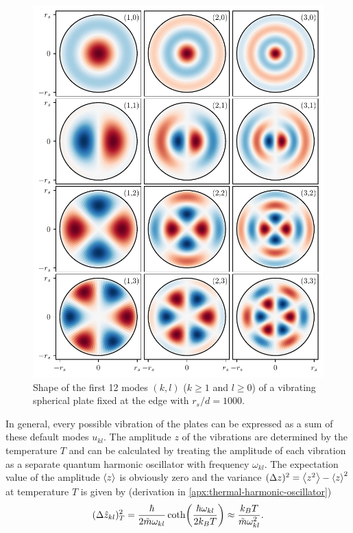 \begin{figure}[!htbp]
  \centering
  \includegraphics[width=\textwidth]{./../figures/vibrations/vibrational-modes-rd_bu.pdf}
  \caption{Shape of the first 12 modes $(k,l)$ ($k \geq 1$ and $l \geq 0$) of a vibrating spherical plate fixed at the edge with $r_s/d = 1000$.}
  \label{fig:5:vibrational-modes}
\end{figure}
In general, every possible vibration of the plates can be expressed as a sum of these default modes $u_{kl}$.
The amplitude $z$ of the vibrations are determined by the temperature $T$ and can be calculated by treating the amplitude of each vibration as a separate quantum harmonic oscillator with frequency $\omega_{kl}$.
The expectation value of the amplitude $\left\langle z\right\rangle$ is obviously zero and the variance $(\Delta z)^2 = \left\langle z^2\right\rangle - \left\langle z\right\rangle^2$ at temperature $T$ is given by (derivation in \cref{apx:thermal-harmonic-oscillator})
\begin{equation}\label{eq:5:amplitude-variance}
  (\Delta \hat{z}_{kl})^2_T = \frac{\hbar}{2\tilde{m}\omega_{kl}}\coth(\frac{\hbar \omega_{kl}}{2k_BT}) \approx \frac{k_B T}{\tilde{m}\omega_{kl}^2} .
\end{equation}
